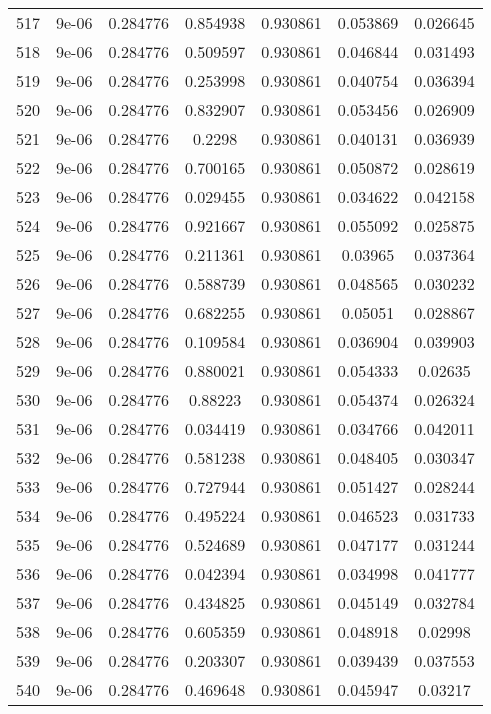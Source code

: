 \begin{table}
\begin{tabular*}{\linewidth}{c|c|c|c|c|c|c}
517 & 9e-06 & 0.284776 & 0.854938 & 0.930861 & 0.053869 & 0.026645\\
518 & 9e-06 & 0.284776 & 0.509597 & 0.930861 & 0.046844 & 0.031493\\
519 & 9e-06 & 0.284776 & 0.253998 & 0.930861 & 0.040754 & 0.036394\\
520 & 9e-06 & 0.284776 & 0.832907 & 0.930861 & 0.053456 & 0.026909\\
521 & 9e-06 & 0.284776 & 0.2298 & 0.930861 & 0.040131 & 0.036939\\
522 & 9e-06 & 0.284776 & 0.700165 & 0.930861 & 0.050872 & 0.028619\\
523 & 9e-06 & 0.284776 & 0.029455 & 0.930861 & 0.034622 & 0.042158\\
524 & 9e-06 & 0.284776 & 0.921667 & 0.930861 & 0.055092 & 0.025875\\
525 & 9e-06 & 0.284776 & 0.211361 & 0.930861 & 0.03965 & 0.037364\\
526 & 9e-06 & 0.284776 & 0.588739 & 0.930861 & 0.048565 & 0.030232\\
527 & 9e-06 & 0.284776 & 0.682255 & 0.930861 & 0.05051 & 0.028867\\
528 & 9e-06 & 0.284776 & 0.109584 & 0.930861 & 0.036904 & 0.039903\\
529 & 9e-06 & 0.284776 & 0.880021 & 0.930861 & 0.054333 & 0.02635\\
530 & 9e-06 & 0.284776 & 0.88223 & 0.930861 & 0.054374 & 0.026324\\
531 & 9e-06 & 0.284776 & 0.034419 & 0.930861 & 0.034766 & 0.042011\\
532 & 9e-06 & 0.284776 & 0.581238 & 0.930861 & 0.048405 & 0.030347\\
533 & 9e-06 & 0.284776 & 0.727944 & 0.930861 & 0.051427 & 0.028244\\
534 & 9e-06 & 0.284776 & 0.495224 & 0.930861 & 0.046523 & 0.031733\\
535 & 9e-06 & 0.284776 & 0.524689 & 0.930861 & 0.047177 & 0.031244\\
536 & 9e-06 & 0.284776 & 0.042394 & 0.930861 & 0.034998 & 0.041777\\
537 & 9e-06 & 0.284776 & 0.434825 & 0.930861 & 0.045149 & 0.032784\\
538 & 9e-06 & 0.284776 & 0.605359 & 0.930861 & 0.048918 & 0.02998\\
539 & 9e-06 & 0.284776 & 0.203307 & 0.930861 & 0.039439 & 0.037553\\
540 & 9e-06 & 0.284776 & 0.469648 & 0.930861 & 0.045947 & 0.03217\\
\end{tabular*}
\end{table}
